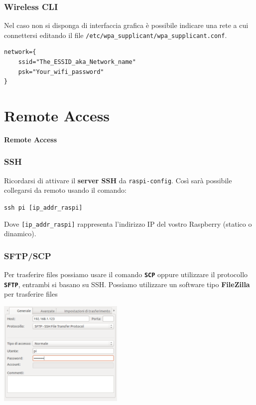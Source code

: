 \documentclass[xcolor=svgnames,11pt]{beamer}
\begin{document}
\begin{frame}[fragile]\frametitle{Wireless CLI}
Nel caso non si disponga di interfaccia grafica \`e possibile indicare una rete a cui connettersi editando il file \texttt{/etc/wpa\_supplicant/wpa\_supplicant.conf}.

\medskip
\begin{verbatim}
network={
    ssid="The_ESSID_aka_Network_name"
    psk="Your_wifi_password"
}
\end{verbatim}
\end{frame}

\section{Remote Access}
\begin{frame}{}
\begin{center}
\begin{Huge}
{\color{green_raspi} \textbf{Remote Access}}
\end{Huge}
\end{center}
\end{frame}

\begin{frame}\frametitle{SSH}
Ricordarsi di attivare il \textbf{server SSH} da \texttt{raspi-config}. Cos\`i sar\`a possibile collegarsi da remoto usando il comando:
\medskip
\begin{center}
\texttt{ssh pi \@ [ip\_addr\_raspi]}
\end{center}
Dove \texttt{[ip\_addr\_raspi]} rappresenta l'indirizzo IP del vostro Raspberry (statico o dinamico).
\end{frame}

\begin{frame}\frametitle{SFTP/SCP}
Per trasferire files possiamo usare il comando \textbf{\texttt{SCP}} oppure utilizzare il protocollo \texttt{\textbf{SFTP}}, entrambi si basano su SSH. Possiamo utilizzare un software tipo \textbf{FileZilla} per trasferire files
\medskip
\begin{center}
\includegraphics[width=6cm]{filezilla.png}
\end{center}
\end{frame}
\end{document}
